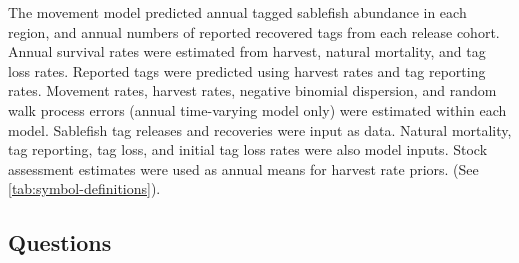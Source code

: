 \documentclass{article}
\begin{document}
The movement model predicted annual tagged sablefish abundance in each region, and annual numbers of reported recovered tags from each release cohort. Annual survival rates were estimated from harvest, natural mortality, and tag loss rates. Reported tags were predicted using harvest rates and tag reporting rates. Movement rates, harvest rates, negative binomial dispersion, and random walk process errors (annual time-varying model only) were estimated within each model. Sablefish tag releases and recoveries were input as data. Natural mortality, tag reporting, tag loss, and initial tag loss rates were also model inputs. Stock assessment estimates were used as annual means for harvest rate priors. (See \autoref{tab:symbol-definitions}).

\subsection{Questions}
\end{document}
